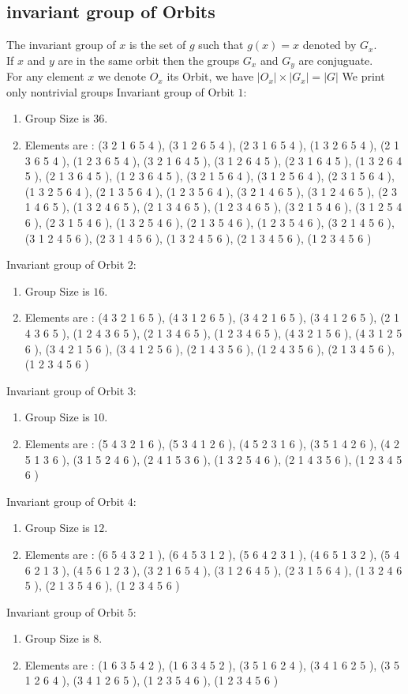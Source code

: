 \documentclass[12pt]{article}
\begin{document}
\subsection{invariant group of Orbits}
\noindent The invariant group of $x$ is the set of $g$ such that $g(x)=x$ denoted by $G_x$.\\
If $x$ and $y$ are in the same orbit then the groups $G_x$ and  $G_y$ are conjuguate.\\
For any element $x$ we denote $O_x$ its Orbit, we have $|O_x|\times |G_x|=|G|$
We print only nontrivial groups
Invariant group of Orbit $1$:
\begin{enumerate}
\item Group Size is $36$.
\item Elements are : (3 2 1 6 5 4  ), (3 1 2 6 5 4  ), (2 3 1 6 5 4  ), (1 3 2 6 5 4  ), (2 1 3 6 5 4  ), (1 2 3 6 5 4  ), (3 2 1 6 4 5  ), (3 1 2 6 4 5  ), (2 3 1 6 4 5  ), (1 3 2 6 4 5  ), (2 1 3 6 4 5  ), (1 2 3 6 4 5  ), (3 2 1 5 6 4  ), (3 1 2 5 6 4  ), (2 3 1 5 6 4  ), (1 3 2 5 6 4  ), (2 1 3 5 6 4  ), (1 2 3 5 6 4  ), (3 2 1 4 6 5  ), (3 1 2 4 6 5  ), (2 3 1 4 6 5  ), (1 3 2 4 6 5  ), (2 1 3 4 6 5  ), (1 2 3 4 6 5  ), (3 2 1 5 4 6  ), (3 1 2 5 4 6  ), (2 3 1 5 4 6  ), (1 3 2 5 4 6  ), (2 1 3 5 4 6  ), (1 2 3 5 4 6  ), (3 2 1 4 5 6  ), (3 1 2 4 5 6  ), (2 3 1 4 5 6  ), (1 3 2 4 5 6  ), (2 1 3 4 5 6  ), (1 2 3 4 5 6  )
\end{enumerate}
Invariant group of Orbit $2$:
\begin{enumerate}
\item Group Size is $16$.
\item Elements are : (4 3 2 1 6 5  ), (4 3 1 2 6 5  ), (3 4 2 1 6 5  ), (3 4 1 2 6 5  ), (2 1 4 3 6 5  ), (1 2 4 3 6 5  ), (2 1 3 4 6 5  ), (1 2 3 4 6 5  ), (4 3 2 1 5 6  ), (4 3 1 2 5 6  ), (3 4 2 1 5 6  ), (3 4 1 2 5 6  ), (2 1 4 3 5 6  ), (1 2 4 3 5 6  ), (2 1 3 4 5 6  ), (1 2 3 4 5 6  )
\end{enumerate}
Invariant group of Orbit $3$:
\begin{enumerate}
\item Group Size is $10$.
\item Elements are : (5 4 3 2 1 6  ), (5 3 4 1 2 6  ), (4 5 2 3 1 6  ), (3 5 1 4 2 6  ), (4 2 5 1 3 6  ), (3 1 5 2 4 6  ), (2 4 1 5 3 6  ), (1 3 2 5 4 6  ), (2 1 4 3 5 6  ), (1 2 3 4 5 6  )
\end{enumerate}
Invariant group of Orbit $4$:
\begin{enumerate}
\item Group Size is $12$.
\item Elements are : (6 5 4 3 2 1  ), (6 4 5 3 1 2  ), (5 6 4 2 3 1  ), (4 6 5 1 3 2  ), (5 4 6 2 1 3  ), (4 5 6 1 2 3  ), (3 2 1 6 5 4  ), (3 1 2 6 4 5  ), (2 3 1 5 6 4  ), (1 3 2 4 6 5  ), (2 1 3 5 4 6  ), (1 2 3 4 5 6  )
\end{enumerate}
Invariant group of Orbit $5$:
\begin{enumerate}
\item Group Size is $8$.
\item Elements are : (1 6 3 5 4 2  ), (1 6 3 4 5 2  ), (3 5 1 6 2 4  ), (3 4 1 6 2 5  ), (3 5 1 2 6 4  ), (3 4 1 2 6 5  ), (1 2 3 5 4 6  ), (1 2 3 4 5 6  )
\end{enumerate}
\end{document}

